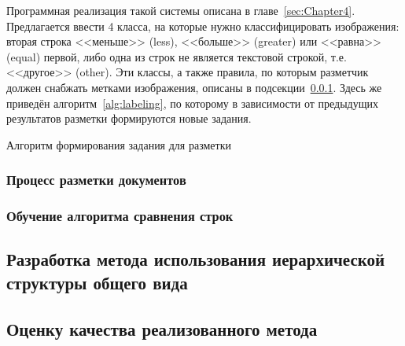Программная реализация такой системы описана в главе~\ref{sec:Chapter4}.
Предлагается ввести 4 класса, на которые нужно классифицировать изображения: вторая строка <<меньше>> (less), <<больше>> (greater) или <<равна>> (equal) первой, либо одна из строк не является текстовой строкой, т.е. <<другое>> (other).
Эти классы, а также правила, по которым разметчик должен снабжать метками изображения, описаны в подсекции~\ref{subsubsec:labelingprocess}.
Здесь же приведён алгоритм~\ref{alg:labeling}, по которому в зависимости от предыдущих результатов разметки формируются новые задания.

\begin{algorithm}
    \begin{algorithmic}
    \end{algorithmic}
    \caption{Алгоритм формирования задания для разметки}
    \label{alg:labeling}
\end{algorithm}



\subsubsection{Процесс разметки документов}
\label{subsubsec:labelingprocess}


\subsubsection{Обучение алгоритма сравнения строк}


\subsection{Разработка метода использования иерархической структуры общего вида}
\label{subsec:usemethod}


\subsection{Оценку качества реализованного метода}
\label{subsec:evaluation}
